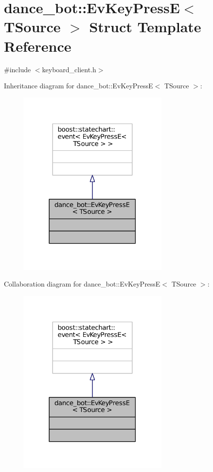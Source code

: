 \hypertarget{structdance__bot_1_1EvKeyPressE}{}\section{dance\+\_\+bot\+:\+:Ev\+Key\+PressE$<$ T\+Source $>$ Struct Template Reference}
\label{structdance__bot_1_1EvKeyPressE}


{\ttfamily \#include $<$keyboard\+\_\+client.\+h$>$}



Inheritance diagram for dance\+\_\+bot\+:\+:Ev\+Key\+PressE$<$ T\+Source $>$\+:
\nopagebreak
\begin{figure}[H]
\begin{center}
\leavevmode
\includegraphics[width=213pt]{structdance__bot_1_1EvKeyPressE__inherit__graph}
\end{center}
\end{figure}


Collaboration diagram for dance\+\_\+bot\+:\+:Ev\+Key\+PressE$<$ T\+Source $>$\+:
\nopagebreak
\begin{figure}[H]
\begin{center}
\leavevmode
\includegraphics[width=213pt]{structdance__bot_1_1EvKeyPressE__coll__graph}
\end{center}
\end{figure}


